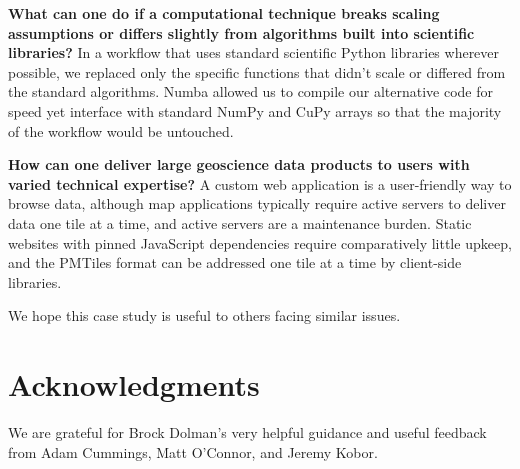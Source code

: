 \textbf{What can one do if a computational technique breaks scaling assumptions or differs slightly from algorithms built into scientific libraries?} In a workflow that uses standard scientific Python libraries wherever possible, we replaced only the specific functions that didn't scale or differed from the standard algorithms. Numba allowed us to compile our alternative code for speed yet interface with standard NumPy and CuPy arrays so that the majority of the workflow would be untouched.

\textbf{How can one deliver large geoscience data products to users with varied technical expertise?} A custom web application is a user-friendly way to browse data, although map applications typically require active servers to deliver data one tile at a time, and active servers are a maintenance burden. Static websites with pinned JavaScript dependencies require comparatively little upkeep, and the PMTiles format can be addressed one tile at a time by client-side libraries.

We hope this case study is useful to others facing similar issues.

\section*{Acknowledgments}

We are grateful for Brock Dolman's very helpful guidance and useful feedback from Adam Cummings, Matt O'Connor, and Jeremy Kobor.
